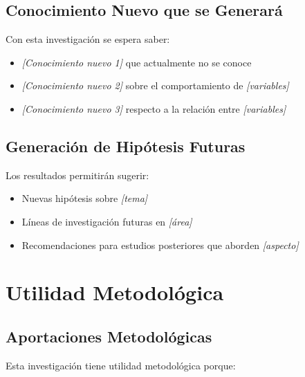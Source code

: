 \subsection{Conocimiento Nuevo que se Generará}

Con esta investigación se espera saber:

\begin{itemize}
    \item \textit{[Conocimiento nuevo 1]} que actualmente no se conoce
    \item \textit{[Conocimiento nuevo 2]} sobre el comportamiento de \textit{[variables]}
    \item \textit{[Conocimiento nuevo 3]} respecto a la relación entre \textit{[variables]}
\end{itemize}

\subsection{Generación de Hipótesis Futuras}

Los resultados permitirán sugerir:

\begin{itemize}
    \item Nuevas hipótesis sobre \textit{[tema]}
    \item Líneas de investigación futuras en \textit{[área]}
    \item Recomendaciones para estudios posteriores que aborden \textit{[aspecto]}
\end{itemize}

\section{Utilidad Metodológica}
\label{sec:utilidad_metodologica}


\subsection{Aportaciones Metodológicas}

Esta investigación tiene utilidad metodológica porque:

